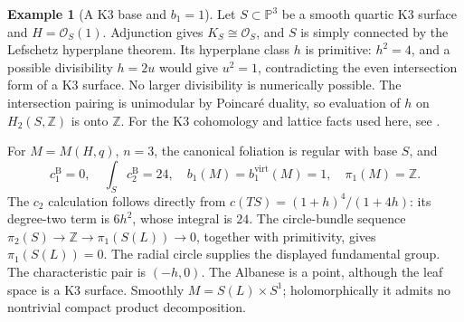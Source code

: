 \documentclass[12pt]{amsart}
\theoremstyle{definition}
\newtheorem{eg}[thm]{Example}
\theoremstyle{remark}
\numberwithin{equation}{section}
\newcommand{\cO}{\mathcal{O}}
\newcommand{\Z}{\mathbb{Z}}
\newcommand{\mP}{\mathbb{P}}
\newcommand{\bas}{\mathrm{B}}
\newcommand{\virt}{\mathrm{virt}}
\begin{document}
\begin{eg}[A K3 base and $b_1=1$]\label{eg:k3}
Let $S\subset\mP^3$ be a smooth quartic K3 surface and
$H=\cO_S(1)$. Adjunction gives $K_S\cong\cO_S$, and $S$ is
simply connected by the Lefschetz hyperplane theorem. Its hyperplane
class $h$ is primitive: $h^2=4$, and a possible divisibility $h=2u$
would give $u^2=1$, contradicting the even intersection form of a K3
surface. No larger divisibility is numerically possible. The intersection
pairing is unimodular by Poincar\'e duality, so evaluation of $h$ on
$H_2(S,\Z)$ is onto $\Z$.
For the K3 cohomology and lattice facts used here, see
\cite[Chapters 1 and 14]{Huybrechts}.

For $M=M(H,q)$, $n=3$, the canonical foliation is regular with base
$S$, and
\begin{equation}\label{eq:k3numbers}
c_1^{\bas}=0,\quad \int_S c_2^{\bas}=24,\quad
b_1(M)=b_1^{\virt}(M)=1,\quad \pi_1(M)=\Z.
\end{equation}
The $c_2$ calculation follows directly from
$c(TS)=(1+h)^4/(1+4h)$: its degree-two term is $6h^2$, whose
integral is $24$. The circle-bundle sequence
$\pi_2(S)\to\Z\to\pi_1(S(L))\to0$, together with primitivity,
gives $\pi_1(S(L))=0$. The radial circle supplies the displayed
fundamental group. The characteristic pair is $(-h,0)$.
The Albanese is a point, although the leaf space is a K3 surface.
Smoothly $M=S(L)\times S^1$; holomorphically it admits no nontrivial
compact product decomposition.
\end{eg}
\end{document}

